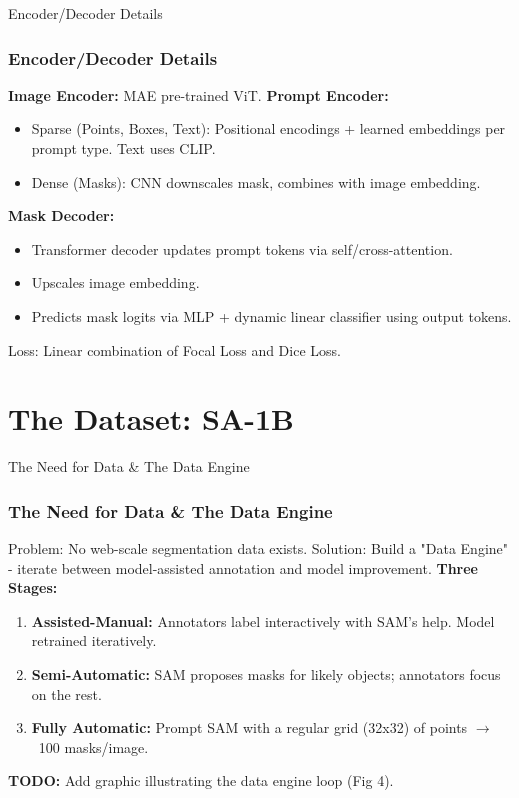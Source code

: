 \documentclass{beamer}
\begin{document}
\begin{frame}{Encoder/Decoder Details}
    \frametitle{Encoder/Decoder Details}
    \textbf{Image Encoder:} MAE pre-trained ViT.
    \textbf{Prompt Encoder:}
    \begin{itemize}
        \item Sparse (Points, Boxes, Text): Positional encodings + learned embeddings per prompt type. Text uses CLIP.
        \item Dense (Masks): CNN downscales mask, combines with image embedding.
    \end{itemize}
    \textbf{Mask Decoder:}
    \begin{itemize}
        \item Transformer decoder updates prompt tokens via self/cross-attention.
        \item Upscales image embedding.
        \item Predicts mask logits via MLP + dynamic linear classifier using output tokens.
    \end{itemize}
    Loss: Linear combination of Focal Loss and Dice Loss.
\end{frame}


\section{The Dataset: SA-1B}

\begin{frame}{The Need for Data \& The Data Engine}
    \frametitle{The Need for Data \& The Data Engine}
    Problem: No web-scale segmentation data exists.
    Solution: Build a "Data Engine" - iterate between model-assisted annotation and model improvement.
    \textbf{Three Stages:}
    \begin{enumerate}
        \item \textbf{Assisted-Manual:} Annotators label interactively with SAM's help. Model retrained iteratively.
        \item \textbf{Semi-Automatic:} SAM proposes masks for likely objects; annotators focus on the rest.
        \item \textbf{Fully Automatic:} Prompt SAM with a regular grid (32x32) of points $\rightarrow$ ~100 masks/image.
    \end{enumerate}
    \vfill
    \textbf{TODO:} Add graphic illustrating the data engine loop (Fig 4).
\end{frame}
\end{document}
